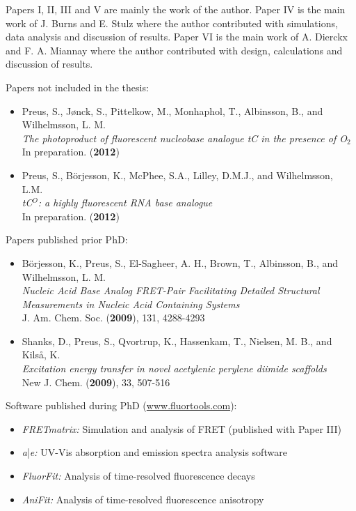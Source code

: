Papers I, II, III and V are mainly the work of the author. Paper IV is the main work of J. Burns and E. Stulz where the author contributed with simulations, data analysis and discussion of results. Paper VI is the main work of A. Dierckx and F. A. Miannay where the author contributed with design, calculations and discussion of results.

\newpage
\restoregeometry
{} %
Papers not included in the thesis:

\begin{itemize}
  \item Preus, S., Jønck, S., Pittelkow, M., Monhaphol, T., Albinsson, B., and Wilhelmsson, L. M.\\
  \textit{The photoproduct of fluorescent nucleobase analogue tC in the presence of O$_2$}\\
  In preparation. (\textbf{2012})
  \item Preus, S., Börjesson, K., McPhee, S.A., Lilley, D.M.J., and Wilhelmsson, L.M.\\
  \textit{tC$^O$: a highly fluorescent RNA base analogue}\\
  In preparation. (\textbf{2012})
\end{itemize}
\vspace{1cm}
Papers published prior PhD:
\begin{itemize}
  \item Börjesson, K., Preus, S., El-Sagheer, A. H., Brown, T., Albinsson, B., and Wilhelmsson, L. M.\\
  \textit{Nucleic Acid Base Analog FRET-Pair Facilitating Detailed Structural Measurements in Nucleic Acid Containing Systems}\\
  J. Am. Chem. Soc. (\textbf{2009}), 131, 4288-4293
  \item Shanks, D., Preus, S., Qvortrup, K., Hassenkam, T., Nielsen, M. B., and Kilså, K.\\
  \textit{Excitation energy transfer in novel acetylenic perylene diimide scaffolds}\\
  New J. Chem. (\textbf{2009}), 33, 507-516
\end{itemize}

\vspace{2 cm}
 Software published during PhD (\url{www.fluortools.com}):

\begin{itemize}
  \item \textit{FRETmatrix:} Simulation and analysis of FRET (published with Paper III)
  \item \textit{a}|\textit{e:} UV-Vis absorption and emission spectra analysis software
  \item \textit{FluorFit:} Analysis of time-resolved fluorescence decays
  \item \textit{AniFit:} Analysis of time-resolved fluorescence anisotropy
\end{itemize}
\thispagestyle{empty}
\restoregeometry
